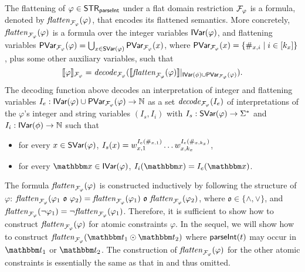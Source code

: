 The flattening of $\varphi \in {\sf STR}_{\textsf{parseInt}}$ under a flat domain restriction $\mathcal{F}_\varphi$ is a {\paexp} formula, denoted by $\mathit{flatten}_{\mathcal{F}_\varphi}(\varphi)$, that encodes its flattened semantics.
%
More concretely, $\mathit{flatten}_{\mathcal{F}_\varphi}(\varphi)$ is a formula over the integer variables $\textsf{IVar}(\varphi)$,  and flattening variables $\textsf{PVar}_{\mathcal{F}_\varphi}(\varphi) = \bigcup_{x \in \textsf{SVar}(\varphi)} \textsf{PVar}_{\mathcal{F}_\varphi}(x)$, where $\textsf{PVar}_{\mathcal{F}_\varphi}(x) = \{\#_{x,i} \mid i \in [k_x]\}$, plus some other auxiliary variables, such that 
%
$$\llbracket \varphi \rrbracket_{\mathcal{F}_\varphi} =\mathit{decode}_{\mathcal{F}_\varphi}(\llbracket \mathit{flatten}_{\mathcal{F}_\varphi}(\varphi) \rrbracket |_{\textsf{IVar}(\phi) \cup \textsf{PVar}_{\mathcal{F}_\varphi}(\varphi)}).$$
%
The decoding function above decodes an interpretation of integer and flattening variables $I_e: \textsf{IVar}(\varphi) \cup \textsf{PVar}_{\mathcal{F}_\varphi}(\varphi) \rightarrow \mathbb{N}$ as a set $\mathit{decode}_{\mathcal{F}_\varphi}(I_e)$ of interpretations of the $\varphi$'s integer and string variables $(I_s, I_i)$ with $I_s: \textsf{SVar}(\varphi) \rightarrow \Sigma^*$ and $I_i: \textsf{IVar}(\phi) \rightarrow \mathbb{N}$ such that 
\begin{itemize}
\item  
for every $ x \in \textsf{SVar}(\varphi)$, $I_s(x) = w_{x,1}^{I_e(\#_{x,1})} \ldots  w_{x,k_x}^{I_e(\#_{x,k_x})}$, 
%
\item for every $ \ivarx \in \ivar(\varphi)$, $I_i(\ivarx) = I_e(\ivarx)$.
\end{itemize}

The formula $\mathit{flatten}_{\mathcal{F}_\varphi}(\varphi)$ is constructed inductively by following the structure of $\varphi$: $\flatten_{\flatfun_\varphi}(\varphi_1\ \mathfrak{o}\ \varphi_2) = \flatten_{\flatfun_\varphi}(\varphi_1) \ \mathfrak{o}\  \flatten_{\flatfun_\varphi}(\varphi_2)$, where $\mathfrak{o} \in \{\wedge, \vee\}$, and $\mathit{flatten}_{\mathcal{F}_\varphi}(\neg \varphi_1) = \neg \mathit{flatten}_{\mathcal{F}_\varphi}(\varphi_1)$. Therefore, it is sufficient to show how to construct $\mathit{flatten}_{\mathcal{F}_\varphi}(\varphi)$ for atomic constraints $\varphi$. 
In the sequel, we will show how to construct $\flatten_{\flatfun_\varphi}(\iterm_1 \op \iterm_2)$ where $\textsf{parseInt}(t)$ may occur in $\iterm_1$ or $\iterm_2$. The construction of $\mathit{flatten}_{\mathcal{F}_\varphi}(\varphi)$ for the other atomic constraints is essentially the same as that in \cite{Parosh:20:PLDI} and thus omitted. 


